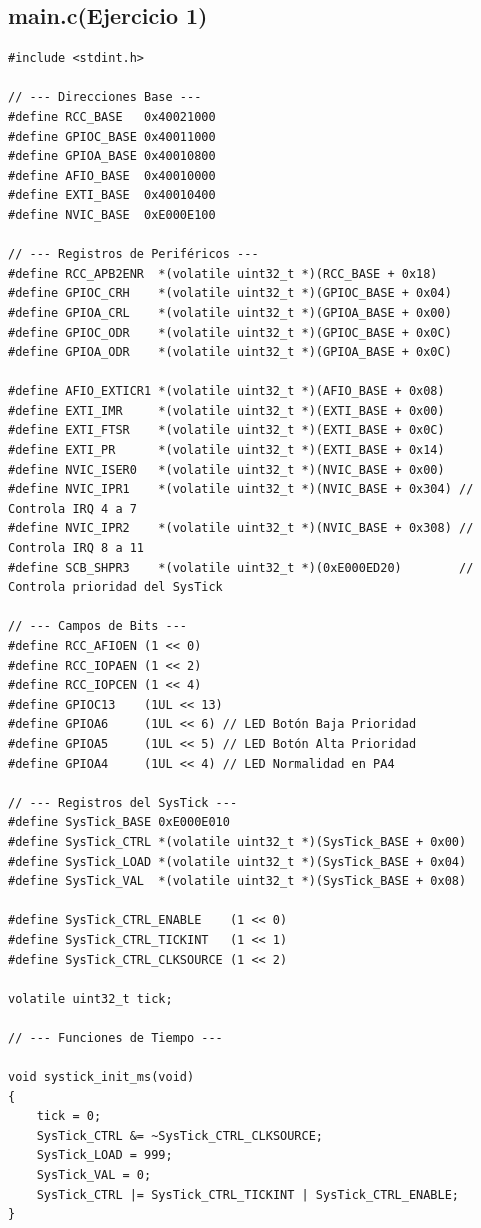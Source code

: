 
\subsection{main.c(Ejercicio 1)}
\begin{lstlisting}[caption={Configuración inicial en main.c}, label={cod:main}]
#include <stdint.h>

// --- Direcciones Base ---
#define RCC_BASE   0x40021000
#define GPIOC_BASE 0x40011000
#define GPIOA_BASE 0x40010800
#define AFIO_BASE  0x40010000
#define EXTI_BASE  0x40010400
#define NVIC_BASE  0xE000E100

// --- Registros de Periféricos ---
#define RCC_APB2ENR  *(volatile uint32_t *)(RCC_BASE + 0x18)
#define GPIOC_CRH    *(volatile uint32_t *)(GPIOC_BASE + 0x04)
#define GPIOA_CRL    *(volatile uint32_t *)(GPIOA_BASE + 0x00)
#define GPIOC_ODR    *(volatile uint32_t *)(GPIOC_BASE + 0x0C)
#define GPIOA_ODR    *(volatile uint32_t *)(GPIOA_BASE + 0x0C)

#define AFIO_EXTICR1 *(volatile uint32_t *)(AFIO_BASE + 0x08)
#define EXTI_IMR     *(volatile uint32_t *)(EXTI_BASE + 0x00)
#define EXTI_FTSR    *(volatile uint32_t *)(EXTI_BASE + 0x0C)
#define EXTI_PR      *(volatile uint32_t *)(EXTI_BASE + 0x14)
#define NVIC_ISER0   *(volatile uint32_t *)(NVIC_BASE + 0x00)
#define NVIC_IPR1    *(volatile uint32_t *)(NVIC_BASE + 0x304) // Controla IRQ 4 a 7
#define NVIC_IPR2    *(volatile uint32_t *)(NVIC_BASE + 0x308) // Controla IRQ 8 a 11
#define SCB_SHPR3    *(volatile uint32_t *)(0xE000ED20)        // Controla prioridad del SysTick

// --- Campos de Bits ---
#define RCC_AFIOEN (1 << 0)
#define RCC_IOPAEN (1 << 2)
#define RCC_IOPCEN (1 << 4)
#define GPIOC13    (1UL << 13)
#define GPIOA6     (1UL << 6) // LED Botón Baja Prioridad
#define GPIOA5     (1UL << 5) // LED Botón Alta Prioridad
#define GPIOA4     (1UL << 4) // LED Normalidad en PA4

// --- Registros del SysTick ---
#define SysTick_BASE 0xE000E010
#define SysTick_CTRL *(volatile uint32_t *)(SysTick_BASE + 0x00)
#define SysTick_LOAD *(volatile uint32_t *)(SysTick_BASE + 0x04)
#define SysTick_VAL  *(volatile uint32_t *)(SysTick_BASE + 0x08)

#define SysTick_CTRL_ENABLE    (1 << 0)
#define SysTick_CTRL_TICKINT   (1 << 1)
#define SysTick_CTRL_CLKSOURCE (1 << 2)

volatile uint32_t tick;

// --- Funciones de Tiempo ---

void systick_init_ms(void)
{
    tick = 0;
    SysTick_CTRL &= ~SysTick_CTRL_CLKSOURCE; 
    SysTick_LOAD = 999; 
    SysTick_VAL = 0; 
    SysTick_CTRL |= SysTick_CTRL_TICKINT | SysTick_CTRL_ENABLE; 
}


\end{lstlisting}

